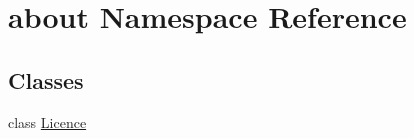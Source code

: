 \hypertarget{namespaceabout}{}\section{about Namespace Reference}
\label{namespaceabout}
\subsection*{Classes}
\begin{DoxyCompactItemize}
\item 
class \mbox{\hyperlink{classabout_1_1_licence}{Licence}}
\end{DoxyCompactItemize}

